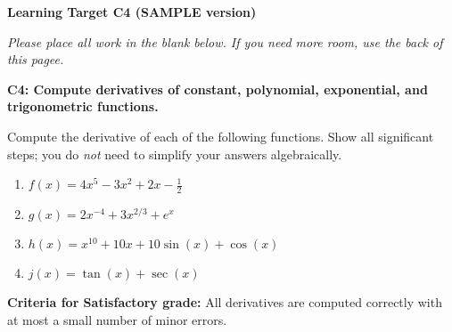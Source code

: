 \documentclass[10pt]{article}
\begin{document}
	\vspace*{0in}

		\begin{center}
			\textbf{Learning Target C4 (SAMPLE version)} \\
		\end{center}

\emph{Please place all work in the blank below. If you need more room, use the back of this pagee.}

\begin{framed}
	\textbf{\textbf{C4:} Compute derivatives of constant, polynomial, exponential, and trigonometric functions.}
\end{framed}

Compute the derivative of each of the following functions. Show all significant steps; you do \textit{not} need to simplify your answers algebraically. 

\begin{enumerate}
    \item $f(x) = 4x^5 - 3x^2 + 2x - \frac{1}{2}$
    \item $g(x) = 2x^{-4} + 3x^{2/3} + e^x$
    \item $h(x) = x^{10} + 10x + 10 \sin(x) + \cos(x)$
    \item $j(x) = \tan(x) + \sec(x)$
\end{enumerate}

\vfill


\begin{small}
    \begin{framed}
        	\textbf{Criteria for Satisfactory grade:} All derivatives are computed correctly with at most a small number of minor errors. 
    \end{framed}

\end{small}
\end{document}
